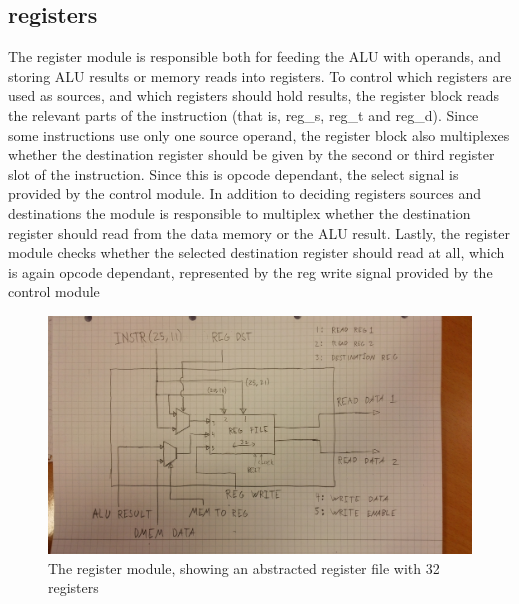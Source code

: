 \subsection{registers}

The register module is responsible both for feeding the ALU with operands, and storing ALU results or memory reads into registers.
To control which registers are used as sources, and which registers should hold results, the register block reads the relevant parts of the instruction (that is, reg\_s, reg\_t and reg\_d). 
Since some instructions use only one source operand, the register block also multiplexes whether the destination register should be given by the second or third register slot of the instruction. Since this is opcode dependant, the select signal is provided by the control module.
In addition to deciding registers sources and destinations the module is responsible to multiplex whether the destination register should read from the data memory or the ALU result.
Lastly, the register module checks whether the selected destination register should read at all, which is again opcode dependant, represented by the reg write signal provided by the control module


\begin{figure}[h!]
    \includegraphics[width=\linewidth]{img/regs.jpg}
    \caption{The register module, showing an abstracted register file with 32 registers}
    \label{fig:registers}
\end{figure}
